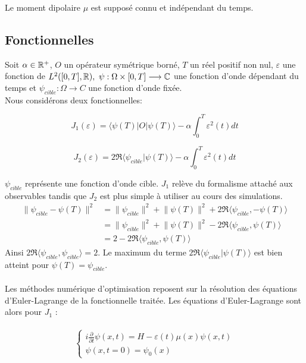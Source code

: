 Le moment dipolaire $\mu$ est supposé connu et indépendant du temps.

\subsection{Fonctionnelles}
Soit $\alpha \in \mathbb R^+$, $O$ un opérateur symétrique borné, $T$ un réel positif non nul, $\varepsilon$ une fonction de $L^2 ([0, T ], \mathbb R),\  \psi : \Omega \times [0, T ] \longrightarrow \mathbb C$ une fonction d’onde dépendant du temps et $\psi_{cible} : \Omega \longrightarrow C$ une fonction d’onde fixée.
\\Nous considérons deux fonctionnelles:

\begin{equation}
J_1(\varepsilon) = \langle \psi(T)|O|\psi(T) \rangle - \alpha \int_0^T \varepsilon^2(t)dt
\end{equation}

\begin{equation}
J_2(\varepsilon) = 2\Re\langle \psi_{cible}|\psi(T)\rangle - \alpha \int_0^T \varepsilon^2(t)dt
\end{equation}

$\psi_{cible}$ représente une fonction d’onde cible. $J_1$ relève du formalisme attaché aux observables tandis que $J_2$ est plus simple à utiliser au cours des simulations.
\begin{align*}
\lVert \psi_{cible} - \psi(T)\rVert^2 &= \lVert \psi_{cible} \rVert^2 + \lVert \psi(T)\rVert^2+ 2 \Re \langle \psi_{cible}, - \psi(T) \rangle\\
&=\lVert \psi_{cible} \rVert^2 + \lVert \psi(T)\rVert^2- 2 \Re \langle \psi_{cible}, \psi(T) \rangle\\
&= 2 - 2\Re\langle \psi_{cible}, \psi(T) \rangle
\end{align*}
Ainsi $2\Re \langle \psi_{cible},\psi_{cible} \rangle = 2$. Le maximum du terme $2\Re\langle \psi_{cible}|\psi(T)\rangle$ est bien atteint pour $\psi(T) = \psi_{cible}$.\\\\
Les méthodes numérique d’optimisation reposent sur la résolution des équations d’Euler-Lagrange de la fonctionnelle traitée. Les équations d'Euler-Lagrange sont alors pour $J_1$ :\\\\

\begin{equation}
\begin{cases}
i \frac{\partial}{\partial t} \psi (x,t) = H - \varepsilon(t)\mu(x)\psi(x,t)\\
\psi(x,t=0)=\psi_0(x)
\end{cases}
\end{equation}

